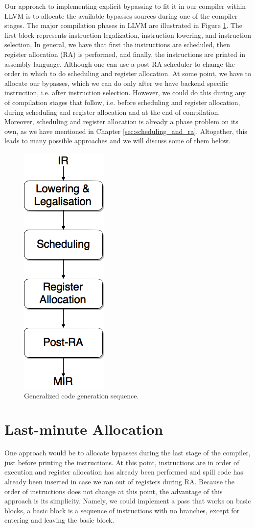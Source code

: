 Our approach to implementing explicit bypassing to fit it in our compiler within LLVM is to allocate the available bypasses sources during one of the compiler stages. The major compilation phases in LLVM are illustrated in Figure \ref{fig:phase_ordering}.  The first block represents instruction legalization, instruction lowering, and instruction selection, In general, we have that first the instructions are scheduled, then register allocation (RA) is performed, and finally, the instructions are printed in assembly language. Although one can use a post-RA scheduler to change the order in which to do scheduling and register allocation. At some point, we have to allocate our bypasses, which we can do only after we have backend specific instruction, i.e. after instruction selection. However, we could do this during any of compilation stages that follow, i.e. before scheduling and register allocation, during scheduling and register allocation and at the end of compilation. Moreover, scheduling and register allocation is already a phase problem on its own, as we have mentioned in Chapter \ref{sec:scheduling_and_ra}. Altogether, this leads to many possible approaches and we will discuss some of them below.

\begin{figure}[H]
\centering
\includegraphics[width=.15\textwidth]{figures/phase_ordering}
\caption{Generalized code generation sequence.}
\label{fig:phase_ordering}
\end{figure}

\section{Last-minute Allocation}\label{sec:last_minute_alloc}
One approach would be to allocate bypasses during the last stage of the compiler, just before printing the instructions. At this point, instructions are in order of execution and register allocation has already been performed and spill code has already been inserted in case we ran out of registers during RA. Because the order of instructions does not change at this point, the advantage of this approach is its simplicity. Namely, we could implement a pass that works on basic blocks, a basic block is a sequence of instructions with no branches, except for entering and leaving the basic block.

